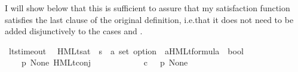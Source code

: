 \begin{isabellebody}
\begin{isamarkuptext}
I will show below that this is sufficient to assure that my satisfaction function satisfies the last clause of the original definition, i.e.\@ that it does not need to be added disjunctively to the cases  and .%
\end{isamarkuptext}\isamarkuptrue%
\isamarkupfalse%
\ lts{\isacharunderscore}{\kern0pt}timeout\ \isanewline
\isanewline
{}\isamarkupfalse%
\ HMLt{\isacharunderscore}{\kern0pt}sat\ {\isacharcolon}{\kern0pt}{\isacharcolon}{\kern0pt}\ {\isacartoucheopen}{\isacharprime}{\kern0pt}s\ {\isasymRightarrow}\ {\isacharprime}{\kern0pt}a\ set\ option\ {\isasymRightarrow}\ {\isacharparenleft}{\kern0pt}{\isacharprime}{\kern0pt}a{\isacharparenright}{\kern0pt}HMLt{\isacharunderscore}{\kern0pt}formula\ {\isasymRightarrow}\ bool{\isacartoucheclose}\ \isanewline
\ \ {\isacharparenleft}{\kern0pt}{\isacartoucheopen}{\isacharunderscore}{\kern0pt}\ {\isasymTTurnstile}{\isacharquery}{\kern0pt}{\isacharbrackleft}{\kern0pt}{\isacharunderscore}{\kern0pt}{\isacharbrackright}{\kern0pt}\ {\isacharunderscore}{\kern0pt}{\isacartoucheclose}\ {\isacharbrackleft}{\kern0pt}{}{}{\isacharcomma}{\kern0pt}\ {}{}{\isacharcomma}{\kern0pt}\ {}{}{\isacharbrackright}{\kern0pt}\ {}{}{\isacharparenright}{\kern0pt}\isanewline
\ \ \isanewline
\ \ \ \ {\isacartoucheopen}{\isacharparenleft}{\kern0pt}p\ {\isasymTTurnstile}{\isacharquery}{\kern0pt}{\isacharbrackleft}{\kern0pt}None{\isacharbrackright}{\kern0pt}\ {\isacharparenleft}{\kern0pt}HMLt{\isacharunderscore}{\kern0pt}conj\ {\isasymPhi}{\isacharparenright}{\kern0pt}{\isacharparenright}{\kern0pt}\ {\isacharequal}{\kern0pt}\ \isanewline
\ \ \ \ \ \ {\isacharparenleft}{\kern0pt}{\isasymforall}\ {\isasymphi}{\isachardot}{\kern0pt}\ {\isasymphi}\ {\isasymin}\isactrlsub c\ {\isasymPhi}\ {\isasymlongrightarrow}\ p\ {\isasymTTurnstile}{\isacharquery}{\kern0pt}{\isacharbrackleft}{\kern0pt}None{\isacharbrackright}{\kern0pt}\ {\isasymphi}{\isacharparenright}{\kern0pt}{\isacartoucheclose}\ \isanewline

\end{isabellebody}
